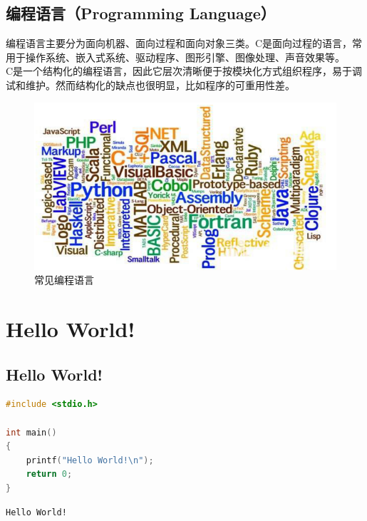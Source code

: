 \vspace{0.5cm}

\subsection{编程语言（Programming Language）}

编程语言主要分为面向机器、面向过程和面向对象三类。C是面向过程的语言，常用于操作系统、嵌入式系统、驱动程序、图形引擎、图像处理、声音效果等。\\

C是一个结构化的编程语言，因此它层次清晰便于按模块化方式组织程序，易于调试和维护。然而结构化的缺点也很明显，比如程序的可重用性差。

\begin{figure}[H]
	\centering
	\includegraphics[scale=0.9]{img/C1/1-1/1.png}
	\caption{常见编程语言}
\end{figure}

\newpage

\section{Hello World!}

\subsection{Hello World!}


\begin{lstlisting}[language=C]
#include <stdio.h>

int main()
{
	printf("Hello World!\n");
	return 0;
}
\end{lstlisting}

\begin{tcolorbox}
	\begin{verbatim}
Hello World!
	\end{verbatim}
\end{tcolorbox}


